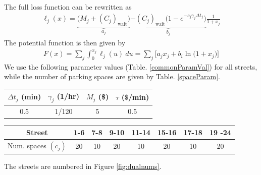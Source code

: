 The full loss function can be rewritten as
\begin{align}
\ell_j(x) = 
\underbrace{
\Big(M_j + (C_j)_\text{wait}\Big)
}_{a_j} 
\underbrace{-
(C_j)_\text{wait}\Big(1-e^{-c_j\gamma_j \Delta t_j}\Big)
}_{b_j}
\frac{1}{1+ x_j} %
\end{align}
The potential function is then given by
\begin{align}
F(x) = \sum_j \int_0^{x_j} \ell_j(u) \ du 
= \sum_j \bigg[ a_j x_j + b_i \ln\big(1+x_j \big)\bigg]
\end{align}
We use the following parameter values (Table. \ref{commonParamVal}) for all streets, while the number of parking spaces are given by Table. \ref{spaceParam}.
\begin{center}\label{commonParamVal}
\begin{tabular}{|cccc|}
\hline
$\Delta t_j $ (min)  & $\gamma_j$ (1/hr) & $M_j$ (\$) & $\tau$ ($\$$/min) \\
\hline
0.5 &  1/120 &  5 & 0.5\\
\hline
\end{tabular}
\end{center}


\begin{center}\label{spaceParam}
\begin{tabular}{|c|ccccccc|}
\hline
Street & 
1-6 & 7-8 & 9-10 & 11-14 & 15-16 & 17-18 & 19 -24 \\
\hline
Num. spaces $(c_j)$ &
20 & 10 & 20 & 10 & 20 & 10 & 20 \\
\hline
\end{tabular}
\end{center}
The streets are numbered in Figure \ref{fig:dualnums}.  


